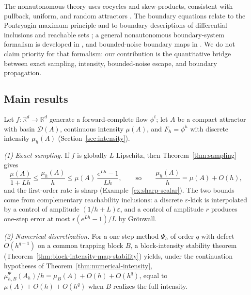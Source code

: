 \documentclass[pdflatex,sn-mathphys-num]{sn-jnl}
\numberwithin{equation}{section}
\theoremstyle{thmstyleone}%
\theoremstyle{definition}
\theoremstyle{remark}
\begin{document}
The nonautonomous theory uses cocycles and skew-products, consistent with pullback, uniform, and random attractors \citep{arnold2006random,cai2026optimal,kloeden2011nonautonomous,carvalho2012attractors,yu2026rigorous,crauel1994attractors,crauel1997random,rasmussen2007attractivity}. The boundary equations relate to the Pontryagin maximum principle
\citep{pontryagin2018mathematical,lee1967foundations,clarke1998nonsmooth,yu2026beyond} and to boundary descriptions of differential inclusions and reachable sets \citep{cardaliaguet1999set,mitchell2005time,yu2026microscopic,baier2007stability,gao2022rolling}; a general nonautonomous boundary-system formalism is developed in \citep{kourliouros2026invariant,wang2026elliptic}, and bounded-noise boundary maps in \citep{lamb2026bifurcations}. We do not claim priority for that formalism: our contribution is the quantitative bridge between exact sampling, intensity, bounded-noise escape, and boundary propagation.

\subsection{Main results}
\label{subsec:intro-contributions}

Let $f:\mathbb R^d\to\mathbb R^d$ generate a forward-complete flow $\phi^t$; let $A$ be a compact attractor with basin $\mathcal D(A)$, continuous intensity $\mu(A)$, and $F_h=\phi^h$ with discrete intensity $\mu_h(A)$ (Section~\ref{sec:intensity}).

\emph{(1) Exact sampling.} If $f$ is globally $L$-Lipschitz, then Theorem~\ref{thm:sampling} gives
\begin{equation}
\label{eq:intro-sampling-bound}
    \frac{\mu(A)}{1+Lh}
    \le
    \frac{\mu_h(A)}{h}
    \le
    \mu(A)\,\frac{e^{Lh}-1}{Lh},
    \qquad\text{so}\qquad
    \frac{\mu_h(A)}{h}=\mu(A)+O(h),
\end{equation}
and the first-order rate is sharp (Example~\ref{ex:sharp-scalar}). The two bounds come from complementary reachability inclusions: a discrete $\varepsilon$-kick is interpolated by a control of amplitude $(1/h+L)\varepsilon$, and a control of amplitude $r$ produces one-step error at most $r(e^{Lh}-1)/L$ by Gr\"onwall.

\emph{(2) Numerical discretization.} For a one-step method $\Psi_h$ of order $q$ with defect $O(h^{q+1})$ on a common trapping block $B$, a block-intensity stability theorem (Theorem~\ref{thm:block-intensity-map-stability}) yields, under the continuation hypotheses of Theorem~\ref{thm:numerical-intensity}, $\mu^{\Psi}_{h,B}(A_h)/h=\mu_B(A)+O(h)+O(h^{q})$, equal to $\mu(A)+O(h)+O(h^q)$ when $B$ realizes the full intensity.
\end{document}
